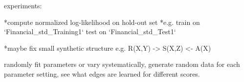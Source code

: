 experiments:

*compute normalized log-likelihood on hold-out set
*e.g. train on `Financial_std_Training1` test on `Financial_std_Test1`

*maybe fix small synthetic structure
e.g. R(X,Y) -> S(X,Z) <- A(X)

randomly fit parameters or vary systematically, generate random data for each parameter setting, see what edges are learned for different scores.